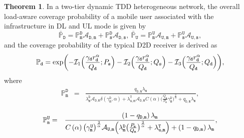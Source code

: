\documentclass[twocolumn,english]{IEEEtran}
\theoremstyle{plain}
\theoremstyle{definition}
\newtheorem{theorem}{\textbf{Theorem}}
\begin{document}
\begin{theorem}

In a two-tier dynamic TDD heterogeneous network, the overall load-aware
coverage probability of a mobile user associated with the infrastructure
in DL and UL mode is given by
\begin{equation}
\bar{\mathbb{P}}_{\mathtt{D}}=\mathbb{P}_{\mathtt{m}}^{\mathtt{D}}\mathcal{A}_{\mathtt{D},\mathtt{m}}+\mathbb{P}_{\mathtt{s}}^{\mathtt{D}}\mathcal{A}_{\mathtt{D},\mathtt{s}},\:\bar{\mathbb{P}}_{\mathtt{U}}=\mathbb{P}_{\mathtt{m}}^{\mathtt{U}}\mathcal{A}_{\mathtt{U},\mathtt{m}}+\mathbb{P}_{\mathtt{s}}^{\mathtt{U}}\mathcal{A}_{\mathtt{U},\mathtt{s}},\label{eq:Ave_coverage}
\end{equation}
and the coverage probability of the typical D2D receiver is derived
as
\begin{equation}
\mathbb{P}_{\mathtt{d}}=\exp\biggl(-\mathcal{I}_{1}\Bigl(\frac{\gamma_{\mathtt{d}}r_{\mathtt{d}}^{\alpha}}{Q_{\mathtt{d}}};P_{\mathtt{s}}\Bigr)-\mathcal{I}_{2}\Bigl(\frac{\gamma_{\mathtt{d}}r_{\mathtt{d}}^{\alpha}}{Q_{\mathtt{d}}};Q_{\mathtt{s}}\Bigr)-\mathcal{I}_{3}\Bigl(\frac{\gamma_{\mathtt{d}}r_{\mathtt{d}}^{\alpha}}{Q_{\mathtt{d}}};Q_{\mathtt{d}}\Bigr)\biggr),\label{eq:D2D_coverage}
\end{equation}
where
\begin{eqnarray}
\mathbb{P}_{\mathtt{m}}^{\mathtt{D}} & = & \frac{q_{\mathtt{D,m}}\lambda_{\mathtt{m}}}{\lambda_{\mathtt{m}}^{\mathtt{D}}\mathcal{A}_{\mathtt{D}\mathtt{,m}}\delta\left(\gamma_{\mathtt{m}}^{\mathtt{D}},\alpha\right)+\lambda_{\mathtt{u,m}}^{\mathtt{T}}\mathcal{A}_{\mathtt{D}\mathtt{,m}}C\left(\alpha\right)\bigl(\frac{Q_{\mathtt{m}}}{P_{\mathtt{m}}}\gamma_{\mathtt{m}}^{\mathtt{D}}\bigr)^{\frac{2}{\alpha}}+q_{\mathtt{D,m}}\lambda_{\mathtt{m}}},\nonumber \\
\label{eq:macro_D}
\end{eqnarray}
\begin{eqnarray}
\mathbb{P}_{\mathtt{m}}^{\mathtt{U}} & = & \frac{\left(1-q_{\mathtt{D,m}}\right)\lambda_{\mathtt{m}}}{C\left(\alpha\right)\bigl(\gamma_{\mathtt{m}}^{\mathtt{U}}\bigr)^{\frac{2}{\alpha}}\mathcal{A}_{\mathtt{U}\mathtt{,m}}\Bigl(\lambda_{\mathtt{m}}^{\mathtt{D}}\bigl(\frac{P_{\mathtt{m}}}{Q_{\mathtt{m}}}\bigr)^{\frac{2}{\alpha}}+\lambda_{\mathtt{u,m}}^{\mathtt{T}}\Bigr)+\left(1-q_{\mathtt{D,m}}\right)\lambda_{\mathtt{m}}},\nonumber \\
\label{eq:macro_U}
\end{eqnarray}
\begin{eqnarray}

\end{eqnarray}
\end{theorem}
\end{document}
